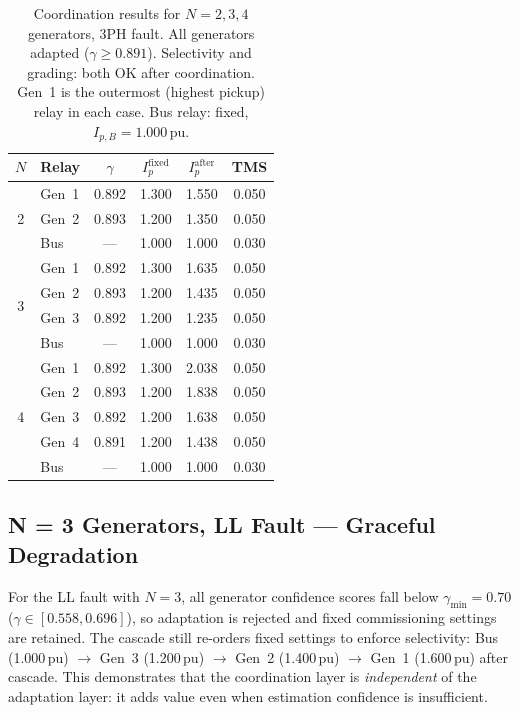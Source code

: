\documentclass[12pt,a4paper]{article}
\theoremstyle{definition}
\theoremstyle{plain}
\begin{document}
\begin{table}[htbp]
  \centering
  \caption{Coordination results for $N = 2, 3, 4$ generators, 3PH fault.
           All generators adapted ($\gamma \geq 0.891$).
           Selectivity and grading: both OK after coordination.
           Gen~1 is the outermost (highest pickup) relay in each case.
           Bus relay: fixed, $I_{p,B} = 1.000\,\text{pu}$.}
  \label{tab:scaling}
  \small
  \begin{tabular}{clcccc}
    \toprule
    $N$ & Relay & $\gamma$ & $I_p^{\text{fixed}}$ &
    $I_p^{\text{after}}$ & TMS \\
    \midrule
    \multirow{3}{*}{2}
      & Gen~1 & 0.892 & 1.300 & 1.550 & 0.050 \\
      & Gen~2 & 0.893 & 1.200 & 1.350 & 0.050 \\
      & Bus   &  ---  & 1.000 & 1.000 & 0.030 \\
    \midrule
    \multirow{4}{*}{3}
      & Gen~1 & 0.892 & 1.300 & 1.635 & 0.050 \\
      & Gen~2 & 0.893 & 1.200 & 1.435 & 0.050 \\
      & Gen~3 & 0.892 & 1.200 & 1.235 & 0.050 \\
      & Bus   &  ---  & 1.000 & 1.000 & 0.030 \\
    \midrule
    \multirow{5}{*}{4}
      & Gen~1 & 0.892 & 1.300 & 2.038 & 0.050 \\
      & Gen~2 & 0.893 & 1.200 & 1.838 & 0.050 \\
      & Gen~3 & 0.892 & 1.200 & 1.638 & 0.050 \\
      & Gen~4 & 0.891 & 1.200 & 1.438 & 0.050 \\
      & Bus   &  ---  & 1.000 & 1.000 & 0.030 \\
    \bottomrule
  \end{tabular}
\end{table}

\subsection{N = 3 Generators, LL Fault — Graceful Degradation}
\label{sec:results:ll}

For the LL fault with $N=3$, all generator confidence scores fall below
$\gamma_{\min} = 0.70$ ($\gamma \in [0.558, 0.696]$), so adaptation is
rejected and fixed commissioning settings are retained.  The cascade still
re-orders fixed settings to enforce selectivity:
Bus (1.000\,pu) $\to$ Gen~3 (1.200\,pu) $\to$ Gen~2 (1.400\,pu)
$\to$ Gen~1 (1.600\,pu) after cascade.  This demonstrates that the
coordination layer is \emph{independent} of the adaptation layer:
it adds value even when estimation confidence is insufficient.
\end{document}
